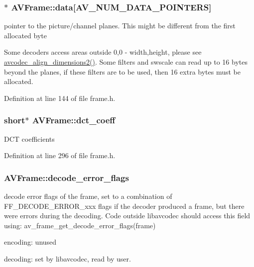 \subsubsection[{\texorpdfstring{data}{data}}]{$\ast$ A\+V\+Frame\+::data\mbox{[}{\bf A\+V\+\_\+\+N\+U\+M\+\_\+\+D\+A\+T\+A\+\_\+\+P\+O\+I\+N\+T\+E\+RS}\mbox{]}}\hypertarget{struct_a_v_frame_a1d0f65014a8d1bf78cec8cbed2304992}{}\label{struct_a_v_frame_a1d0f65014a8d1bf78cec8cbed2304992}
pointer to the picture/channel planes. This might be different from the first allocated byte

Some decoders access areas outside 0,0 -\/ width,height, please see \hyperlink{group__lavc__decoding_ga34e3269dc1b9e2c98e9371241722e7e2}{avcodec\+\_\+align\+\_\+dimensions2()}. Some filters and swscale can read up to 16 bytes beyond the planes, if these filters are to be used, then 16 extra bytes must be allocated. 

Definition at line 144 of file frame.\+h.

\subsubsection[{\texorpdfstring{dct\+\_\+coeff}{dct_coeff}}]{ short$\ast$ A\+V\+Frame\+::dct\+\_\+coeff}\hypertarget{struct_a_v_frame_a8daab6ee939f3653832c45ff04fc9190}{}\label{struct_a_v_frame_a8daab6ee939f3653832c45ff04fc9190}
D\+CT coefficients 

Definition at line 296 of file frame.\+h.

\subsubsection[{\texorpdfstring{decode\+\_\+error\+\_\+flags}{decode_error_flags}}]{ A\+V\+Frame\+::decode\+\_\+error\+\_\+flags}\hypertarget{struct_a_v_frame_a3dd46fd353a405f6e9b91c11d9c5b736}{}\label{struct_a_v_frame_a3dd46fd353a405f6e9b91c11d9c5b736}
decode error flags of the frame, set to a combination of F\+F\+\_\+\+D\+E\+C\+O\+D\+E\+\_\+\+E\+R\+R\+O\+R\+\_\+xxx flags if the decoder produced a frame, but there were errors during the decoding. Code outside libavcodec should access this field using\+: av\+\_\+frame\+\_\+get\+\_\+decode\+\_\+error\+\_\+flags(frame)
\begin{DoxyItemize}
\item encoding\+: unused
\item decoding\+: set by libavcodec, read by user. 
\end{DoxyItemize}

